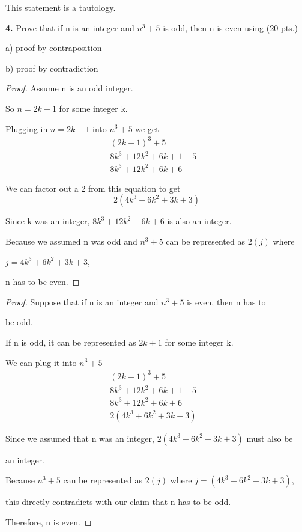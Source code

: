 \documentclass{article} %
\newtheorem{proof}{Proof}
\begin{document}
    This statement is a tautology.
    
    \newpage

    \textbf{4.} Prove that if n is an integer and $n^3 + 5$ is odd, then n is even using (20 pts.)
    
    a) proof by contraposition

    b) proof by contradiction

    \begin{proof}
        Assume n is an odd integer.
    
        So $n = 2k+1$ for some integer k.
    
        Plugging in $n = 2k+1$ into $n^3+5$ we get 
        \begin{equation*}
            \begin{aligned}
                (2k+1)^3+5 &\\
                8k^3+12k^2+6k+1+5 &\\
                8k^3+12k^2+6k+6
            \end{aligned}
        \end{equation*}
        
        We can factor out a 2 from this equation to get $$2(4k^3+6k^2+3k+3)$$
        
        Since k was an integer, $8k^3+12k^2+6k+6$ is also an integer.

        Because we assumed n was odd and $n^3+5$ can be represented as $2(j)$ where 
        
        $j = 4k^3+6k^2+3k+3$, 
        
        n has to be even.

    \end{proof}

    \begin{proof}
        Suppose that if n is an integer and $n^3+5$ is even, then n has to 
        
        be odd.

        If n is odd, it can be represented as $2k+1$ for some integer k.
        
        We can plug it into $n^3+5$ 
        \begin{equation*}
            \begin{aligned}
                (2k+1)^3+5 &\\
                8k^3+12k^2+6k+1+5 &\\
                8k^3+12k^2+6k+6 &\\
                2(4k^3+6k^2+3k+3)
            \end{aligned}
        \end{equation*}

        Since we assumed that n was an integer, $2(4k^3+6k^2+3k+3)$ must also be 
        
        an integer.

        Because $n^3+5$ can be represented as $2(j)$ where $j = (4k^3+6k^2+3k+3)$,
        
        this directly contradicts with our claim that n has to be odd. 

        Therefore, n is even.
    \end{proof}
\end{document}
